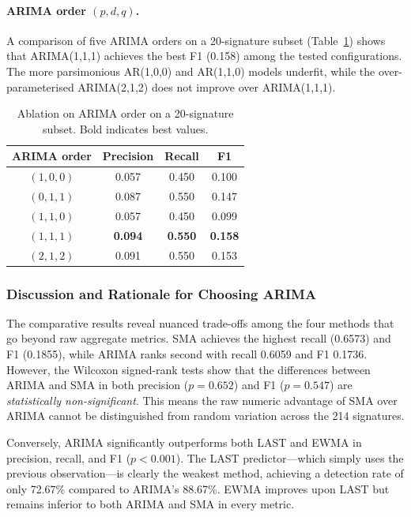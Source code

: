 \documentclass[pdflatex,sn-nature]{sn-jnl}%
\theoremstyle{thmstyleone}%
\theoremstyle{thmstyletwo}%
\theoremstyle{thmstylethree}%
\begin{document}
\paragraph{ARIMA order $(p,d,q)$.}
A comparison of five ARIMA orders on a 20-signature subset (Table~\ref{tab:ablation_arima_order}) shows that ARIMA(1,1,1) achieves the best F1 (0.158) among the tested configurations. The more parsimonious AR(1,0,0) and AR(1,1,0) models underfit, while the over-parameterised ARIMA(2,1,2) does not improve over ARIMA(1,1,1).

\begin{table}[tbp]
\centering
\begin{tabular}{|c|c|c|c|}
\hline
\textbf{ARIMA order} & \textbf{Precision} & \textbf{Recall} & \textbf{F1} \\
\hline
$(1,0,0)$ & 0.057 & 0.450 & 0.100 \\
$(0,1,1)$ & 0.087 & 0.550 & 0.147 \\
$(1,1,0)$ & 0.057 & 0.450 & 0.099 \\
$(1,1,1)$ & \textbf{0.094} & \textbf{0.550} & \textbf{0.158} \\
$(2,1,2)$ & 0.091 & 0.550 & 0.153 \\
\hline
\end{tabular}
\caption{Ablation on ARIMA order on a 20-signature subset. Bold indicates best values.}
\label{tab:ablation_arima_order}
\end{table}

\subsubsection{Discussion and Rationale for Choosing ARIMA}\label{sec:arima_rationale}

The comparative results reveal nuanced trade-offs among the four methods that go beyond raw aggregate metrics. SMA achieves the highest recall (0.6573) and F1 (0.1855), while ARIMA ranks second with recall 0.6059 and F1 0.1736. However, the Wilcoxon signed-rank tests show that the differences between ARIMA and SMA in both precision ($p{=}0.652$) and F1 ($p{=}0.547$) are \textit{statistically non-significant}. This means the raw numeric advantage of SMA over ARIMA cannot be distinguished from random variation across the 214 signatures.

Conversely, ARIMA significantly outperforms both LAST and EWMA in precision, recall, and F1 ($p{<}0.001$). The LAST predictor---which simply uses the previous observation---is clearly the weakest method, achieving a detection rate of only 72.67\% compared to ARIMA's 88.67\%. EWMA improves upon LAST but remains inferior to both ARIMA and SMA in every metric.
\end{document}
